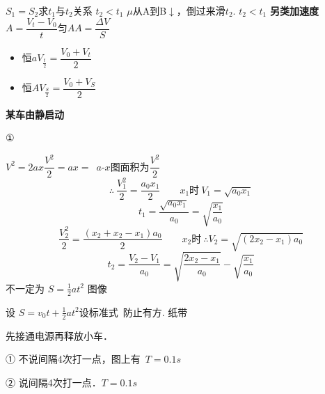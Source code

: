 $S_1=S_2$\quad 求$t_1$与$t_2$关系
$t_2<t_1$
$\mu$从A到B$\downarrow$，倒过来滑$t_2$.
$t_2<t_1$
\textbf{另类加速度}\quad $A=\dfrac{V_t-V_0}{t}$\quad 匀$A$\quad\quad $A=\dfrac{\Delta V}{S}$
\begin{itemize}
\item 恒$a$\quad $V_{\frac t2}=\dfrac{V_0+V_t}{2}$
\item 恒$A$\quad $V_{\frac S2}=\dfrac{V_0+V_S}{2}$
\end{itemize}
\textbf{某车由静启动}

①

$V^2=2ax$\quad $\dfrac{V^2}{2}=ax=$\ $a$-$x$图面积为$\dfrac{V^2}{2}$
\[ \therefore\ \frac{V_1^2}{2}=\frac{a_0x_1}{2}\qquad x_1\text{时}\ V_1=\sqrt{a_0x_1}\]
\[ t_1=\frac{\sqrt{a_0x_1}}{a_0}=\sqrt{\frac{x_1}{a_0}} \]
\[ \frac{V_2^2}{2}=\frac{(x_2+x_2-x_1)a_0}{2}\qquad x_2\text{时}\ \therefore V_2=\sqrt{(2x_2-x_1)a_0}\]
\[ t_2=\frac{V_2-V_1}{a_0}=\sqrt{\frac{2x_2-x_1}{a_0}}-\sqrt{\frac{x_1}{a_0}} \]
不一定为 $S=\tfrac12at^2$ 图像

设 $S=v_0t+\tfrac12at^2$\quad 设标准式\ 防止有方. %
\quad 纸带


先接通电源再释放小车．

① 不说间隔4次打一点，图上有\ $T=0.1\unit{s}$

② 说间隔4次打一点．$T=0.1\unit{s}$


